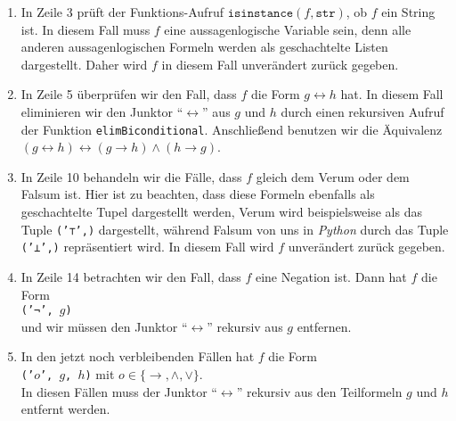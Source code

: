\begin{enumerate}
\item In Zeile 3 prüft der Funktions-Aufruf $\texttt{isinstance}(f, \mathtt{str})$, ob $f$ ein String ist.  In diesem Fall
      muss $f$ eine aussagenlogische Variable sein, denn alle anderen aussagenlogischen Formeln werden als
      geschachtelte Listen dargestellt.  Daher wird $f$ in diesem Fall unverändert zurück gegeben.
\item In Zeile 5 überprüfen wir den Fall, dass $f$ die Form $g \leftrightarrow h$ hat.
      In diesem Fall eliminieren wir den Junktor ``$\leftrightarrow$'' aus $g$ und $h$ durch einen rekursiven
      Aufruf der Funktion \texttt{elimBiconditional}.  Anschließend benutzen wir die Äquivalenz
      \\[0.2cm]
      \hspace*{1.3cm}
      $(g \leftrightarrow h) \leftrightarrow (g \rightarrow h) \wedge (h \rightarrow g)$.
\item In Zeile 10 behandeln wir die Fälle, dass $f$ gleich dem Verum oder dem Falsum ist.
      Hier ist zu beachten, dass diese Formeln ebenfalls als geschachtelte Tupel dargestellt werden,
      Verum wird beispielsweise als das Tuple \texttt{('⊤',)} dargestellt, während Falsum von uns in
      \textsl{Python} durch das Tuple \texttt{('⊥',)} repräsentiert wird.  In diesem Fall wird $f$
      unverändert zurück gegeben.
\item In Zeile 14 betrachten wir den Fall, dass $f$ eine Negation ist.  Dann hat $f$ die Form
      \\[0.2cm]
      \hspace*{1.3cm}
      \texttt{('¬', $g$)}  
      \\[0.2cm]
      und wir müssen den Junktor ``$\leftrightarrow$'' rekursiv aus $g$ entfernen.
\item In den jetzt noch verbleibenden Fällen hat $f$ die Form
      \\[0.2cm]
      \hspace*{1.3cm}
      \texttt{('$o$', $g$, $h$)}  \quad mit $o \in \{\rightarrow, \wedge, \vee\}$.
      \\[0.2cm]
      In diesen Fällen muss der Junktor ``$\leftrightarrow$'' rekursiv aus den Teilformeln $g$ und $h$ entfernt
      werden. 
\end{enumerate}
\FloatBarrier

